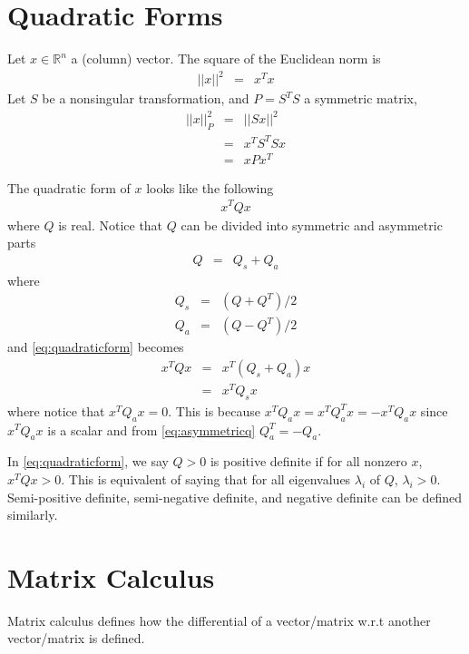 \section{Quadratic Forms}

Let $x\in\mathbb{R}^n$ a (column) vector. The square of the Euclidean norm is
\begin{eqnarray}
	||x||^2 &=& x^Tx \nonumber
\end{eqnarray}
Let $S$ be a nonsingular transformation, and $P=S^TS$ a symmetric matrix,
\begin{eqnarray}
	||x||_P^2 &=& ||Sx||^2 \nonumber \\
	&=& x^TS^TSx \nonumber \\
	&=& xPx^T \nonumber
\end{eqnarray}

The quadratic form of $x$ looks like the following
\begin{eqnarray}
	x^TQx \label{eq:quadraticform}
\end{eqnarray}
where $Q$ is real. Notice that $Q$ can be divided into symmetric and asymmetric parts
\begin{eqnarray}
	Q &=& Q_s + Q_a \nonumber
\end{eqnarray}
where
\begin{eqnarray}
	Q_s &=& (Q + Q^T) / 2 \nonumber \\
	Q_a &=& (Q - Q^T) / 2 \label{eq:asymmetricq}
\end{eqnarray}
and \eqref{eq:quadraticform} becomes
\begin{eqnarray}
	x^TQx &=& x^T(Q_s + Q_a)x \nonumber \\
	&=& x^TQ_sx \nonumber
\end{eqnarray}
where notice that $x^TQ_ax = 0$. This is because $x^TQ_ax=x^TQ_a^Tx=-x^TQ_ax$ since $x^TQ_ax$ is a scalar and from \eqref{eq:asymmetricq} $Q_a^T=-Q_a$.

In \eqref{eq:quadraticform}, we say $Q>0$ is positive definite if for all nonzero $x$, $x^TQx>0$. This is equivalent of saying that for all eigenvalues $\lambda_i$ of $Q$, $\lambda_i>0$. Semi-positive definite, semi-negative definite, and negative definite can be defined similarly.

\section{Matrix Calculus}

Matrix calculus defines how the differential of a vector/matrix w.r.t another vector/matrix is defined.

